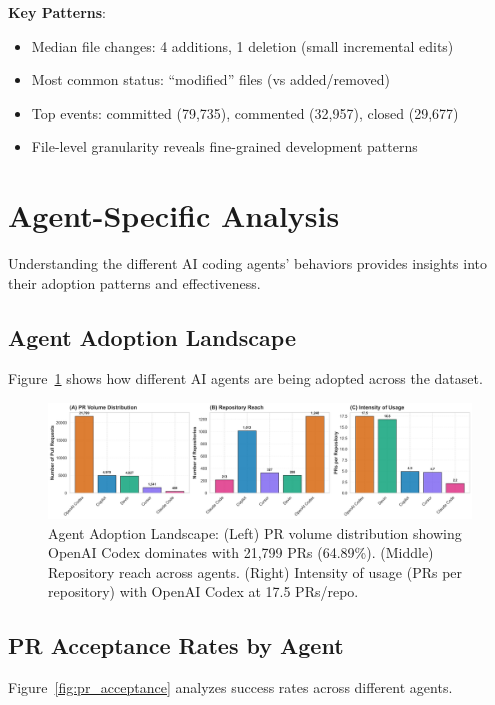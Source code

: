 \documentclass[11pt]{article}
\begin{document}
\textbf{Key Patterns}:
\begin{itemize}
    \item Median file changes: 4 additions, 1 deletion (small incremental edits)
    \item Most common status: ``modified'' files (vs added/removed)
    \item Top events: committed (79,735), commented (32,957), closed (29,677)
    \item File-level granularity reveals fine-grained development patterns
\end{itemize}


\section{Agent-Specific Analysis}

Understanding the different AI coding agents' behaviors provides insights into their adoption patterns and effectiveness.

\subsection{Agent Adoption Landscape}

Figure~\ref{fig:agent_adoption} shows how different AI agents are being adopted across the dataset.

\begin{figure}[H]
\centering
\includegraphics[width=\textwidth]{figures/fig1_agent_adoption_landscape.png}
\caption{Agent Adoption Landscape: (Left) PR volume distribution showing OpenAI Codex dominates with 21,799 PRs (64.89\%). (Middle) Repository reach across agents. (Right) Intensity of usage (PRs per repository) with OpenAI Codex at 17.5 PRs/repo.}
\label{fig:agent_adoption}
\end{figure}

\subsection{PR Acceptance Rates by Agent}

Figure~\ref{fig:pr_acceptance} analyzes success rates across different agents.
\end{document}
